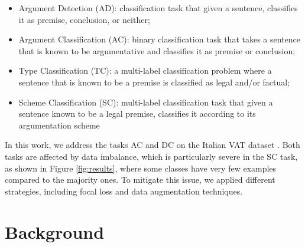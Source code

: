 \documentclass[11pt]{article}
\begin{document}
\begin{itemize}
    \item Argument Detection (AD): classification task that given a sentence, classifies it as premise, conclusion, or neither;
    \item Argument Classification (AC): binary classification task that takes a sentence that is known to be argumentative and classifies it as premise or conclusion;
    \item Type Classification (TC): a multi-label classification problem where a sentence that is known to be a premise is classified as legal and/or factual;
    \item Scheme Classification (SC): multi-label classification task that given a sentence known to be a legal premise, classifies it according to its argumentation scheme \cite{Walton_Reed_Macagno_2008}
\end{itemize}

In this work, we address the tasks AC and DC on the Italian VAT dataset \cite{galli2022}. Both tasks are affected by data imbalance, which is particularly severe in the SC task, as shown in Figure \ref{fig:results}, where some classes have very few examples compared to the majority ones. To mitigate this issue, we applied different strategies, including focal loss \cite{lin2018focallossdenseobject} and data augmentation techniques. 




\section{Background}
\label{sec:background}
\end{document}
